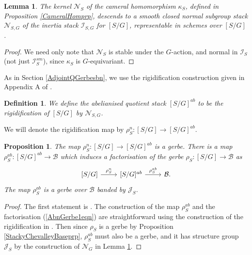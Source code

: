 \documentclass{amsart}
\newtheorem{lemma}[theorem]{Lemma}
\newtheorem{proposition}[theorem]{Proposition}
\newtheorem{definition}[theorem]{Definition}
\theoremstyle{remark}
\numberwithin{theorem}{section}
\numberwithin{equation}{section}
\begin{document}
\begin{lemma}\label{CamKernelDescentlem}
    The kernel $\mathcal N_S$ of the cameral homomorphism $\kappa_S$, defined in Proposition \ref{CameralHomprp}, descends to a smooth closed normal subgroup stack $\mathcal N_{S,G}$ of the inertia stack $\mathcal I_{S,G}$ for $[S/G]$, representable in schemes over $[S/G]$.
\end{lemma}

\begin{proof} 
We need only note that $\mathcal N_S$ is stable under the $G$-action, and normal in $\mathcal I_S$ (not just $\mathcal I_S^{sm}$), since $\kappa_S$ is $G$-equivariant.
\end{proof}

As in Section \ref{AdjointQGerbesbn}, we use the rigidification construction given in Appendix A of \cite{AOV}.

\begin{definition}\label{AbelianisedStackdef}
    We define the \emph{abelianised quotient stack} $[S/G]^{ab}$ to be the rigidification of $[S/G]$ by $\mathcal N_{S,G}$.
\end{definition}

We will denote the rigidification map by $\rho_S^n:[S/G] \rightarrow [S/G]^{ab}$.

\begin{proposition}\label{AbnGerbeprp}
    The map $\rho_S^n:[S/G] \rightarrow [S/G]^{ab}$ is a gerbe. There is a map $\rho_S^{ab}:[S/G]^{ab} \rightarrow \mathcal B$ which induces a factorisation of the gerbe $\rho_S:[S/G] \rightarrow \mathcal B$ as
    \begin{equation}\label{AbnGerbe1eqn}
\begin{tikzcd}
{[S/G]} \arrow[r, "\rho_S^n"] & {[S/G]^{ab}} \arrow[r, "\rho_S^{ab}"] & \mathcal B.
\end{tikzcd}
    \end{equation}
    The map $\rho_S^{ab}$ is a gerbe over $\mathcal B$ banded by $\mathcal J_S$.
\end{proposition}

\begin{proof}
The first statement is \cite[Theorem A.1 (a)]{AOV}. The construction of the map $\rho_S^{ab}$ and the factorisation (\ref{AbnGerbe1eqn}) are straightforward using the construction of the rigidification in \cite[Theorem A.1]{AOV}. Then since $\rho_S$ is a gerbe by Proposition \ref{StackyChevalleyBaseprp}, $\rho_S^{ab}$ must also be a gerbe, and it has structure group $\mathcal J_S$ by the construction of $\mathcal N_G$ in Lemma \ref{CamKernelDescentlem}.
\end{proof}
\end{document}
